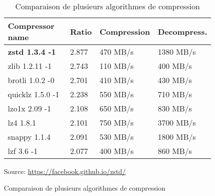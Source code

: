 \documentclass[11pt, a4paper]{specifications}
\newcommand*{\surl}[1]{{\bodyfont\color{clearocean}\selectfont\url{#1}}}
\begin{document}
\begin{figure}[H]
    \centering
    \begin{table}[H]
        \centering
        \begin{tabular}{|l|l|l|l|}\hline
        \textbf{Compressor name} & \textbf{Ratio} &
        \textbf{Compression} & \textbf{Decompress.} \\ \hline
        \textbf{zstd 1.3.4 -1}   & 2.877          & 470 MB/s             & 1380 MB/s            \\ \hline
        zlib 1.2.11 -1           & 2.743          & 110 MB/s             & 400 MB/s             \\ \hline
            brotli 1.0.2 -0          & 2.701          & 410 MB/s             & 430 MB/s             \\ \hline
            quicklz 1.5.0 -1         & 2.238          & 550 MB/s             & 710 MB/s             \\ \hline
            lzo1x 2.09 -1            & 2.108          & 650 MB/s             & 830 MB/s             \\ \hline
            lz4 1.8.1                & 2.101          & 750 MB/s             & 3700 MB/s            \\ \hline
            snappy 1.1.4             & 2.091          & 530 MB/s             & 1800 MB/s            \\ \hline
            lzf 3.6 -1               & 2.077          & 400 MB/s             & 860 MB/s             \\ \hline
      \end{tabular}
    \caption{Comparaison de plusieurs algorithmes de compression}
  \end{table}
  \footnotesize{Source: \surl{https://facebook.github.io/zstd/}}
  \label{fig:zstd_comparison}
\end{figure}
\end{document}
